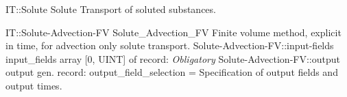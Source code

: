 \begin{AbstractType}
	{IT::Solute}
	{Solute}
	{}
	{{{Transport of soluted  substances.}%
}}
\end{AbstractType}
\begin{RecordType}
	{IT::Solute-Advection-FV}
	{Solute{\_}Advection{\_}FV}
	{}%
	{}%
	{{{Finite volume method, explicit in time, for advection only solute transport.}%
}}
		\RecKey
			{Solute-Advection-FV::input-fields}
			{input{\_}fields}
			{{array [0, UINT] of }{record: }}{}
			{ \it{Obligatory}}
			{}
		\RecKey
			{Solute-Advection-FV::output}
			{output}
			{{gen. record: }}{{output{\_}field{\_}selection}{ = }}
			{ }
			{{{Specification of output fields and output times.}%
}}
\end{RecordType}
